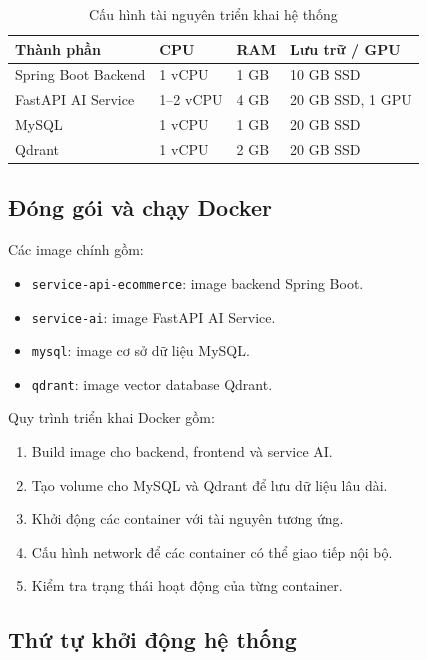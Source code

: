\begin{table}[H]
\centering
\caption{Cấu hình tài nguyên triển khai hệ thống}
\label{tab:resource-config}
\begin{tabular}{|p{4cm}|p{3cm}|p{3cm}|p{4cm}|}
\hline
\textbf{Thành phần} & \textbf{CPU} & \textbf{RAM} & \textbf{Lưu trữ / GPU} \\ \hline
Spring Boot Backend & 1 vCPU & 1 GB & 10 GB SSD \\ \hline
FastAPI AI Service & 1--2 vCPU & 4 GB & 20 GB SSD, 1 GPU \\ \hline
MySQL & 1 vCPU & 1 GB & 20 GB SSD \\ \hline
Qdrant & 1 vCPU & 2 GB & 20 GB SSD \\ \hline
\end{tabular}
\end{table}


\subsection{Đóng gói và chạy Docker}


Các image chính gồm:

\begin{itemize}
    \item \texttt{service-api-ecommerce}: image backend Spring Boot.
    \item \texttt{service-ai}: image FastAPI AI Service.
    \item \texttt{mysql}: image cơ sở dữ liệu MySQL.
    \item \texttt{qdrant}: image vector database Qdrant.
\end{itemize}

Quy trình triển khai Docker gồm:

\begin{enumerate}
    \item Build image cho backend, frontend và service AI.
    \item Tạo volume cho MySQL và Qdrant để lưu dữ liệu lâu dài.
    \item Khởi động các container với tài nguyên tương ứng.
    \item Cấu hình network để các container có thể giao tiếp nội bộ.
    \item Kiểm tra trạng thái hoạt động của từng container.
\end{enumerate}

\subsection{Thứ tự khởi động hệ thống}

